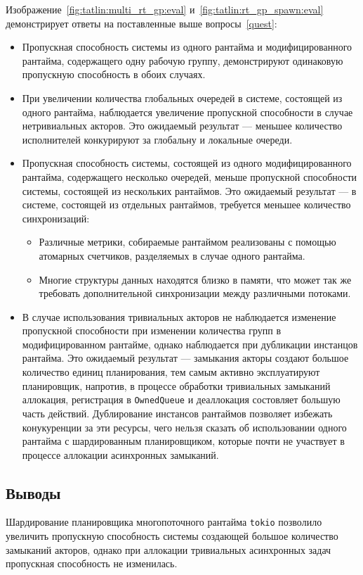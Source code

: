 Изображение~\ref{fig:tatlin:multi_rt_gp:eval} и~\ref{fig:tatlin:rt_gp_spawn:eval} демонстрирует ответы на поставленные выше вопросы~\ref{quest}:

\begin{itemize}
    \item Пропускная способность системы из одного рантайма и модифицированного рантайма, содержащего одну рабочую группу, демонстрируют одинаковую пропускную способность в обоих случаях.
    \item При увеличении количества глобальных очередей в системе, состоящей из одного рантайма, наблюдается увеличение пропускной способности в случае нетривиальных акторов. Это ожидаемый результат --- меньшее количество исполнителей конкурируют за глобальну и локальные очереди.
    \item Пропускная способность системы, состоящей из одного модифицированного рантайма, содержащего несколько очередей, меньше пропускной способности системы, состоящей из нескольких рантаймов. Это ожидаемый результат --- в системе, состоящей из отдельных рантаймов, требуется меньшее количество синхронизаций:
    \begin{itemize}
        \item Различные метрики, собираемые рантаймом реализованы с помощью атомарных счетчиков, разделяемых в случае одного рантайма.
        \item Многие структуры данных находятся близко в памяти, что может так же требовать дополнительной синхронизации между различными потоками.
    \end{itemize}
    \item В случае использования тривиальных акторов не наблюдается изменение пропускной способности при изменении количества групп в модифицированном рантайме, однако наблюдается при дубликации инстанцов рантайма. Это ожидаемый результат --- замыкания акторы создают большое количество единиц планирования, тем самым активно эксплуатируют планировщик, напротив, в процессе обработки тривиальных замыканий аллокация, регистрация в \verb|OwnedQueue| и деаллокация состовляет большую часть действий. Дублирование инстансов рантаймов позволяет избежать конукуренции за эти ресурсы, чего нельзя сказать об использовании одного рантайма с шардированным планировщиком, которые почти не участвует в процессе аллокации асинхронных замыканий.
\end{itemize}

\subsection{Выводы}

Шардирование планировщика многопоточного рантайма \verb|tokio| позволило увеличить пропускную способность системы создающей большое количество замыканий акторов, однако при аллокации тривиальных асинхронных задач пропускная способность не изменилась.
